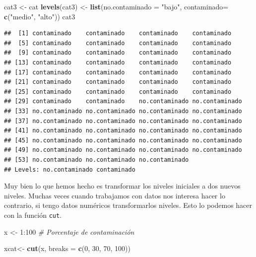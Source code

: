 \documentclass[]{article}
\newenvironment{Shaded}{\begin{snugshade}}{\end{snugshade}}
\newcommand{\KeywordTok}[1]{\textcolor[rgb]{0.13,0.29,0.53}{\textbf{{#1}}}}
\newcommand{\DataTypeTok}[1]{\textcolor[rgb]{0.13,0.29,0.53}{{#1}}}
\newcommand{\DecValTok}[1]{\textcolor[rgb]{0.00,0.00,0.81}{{#1}}}
\newcommand{\StringTok}[1]{\textcolor[rgb]{0.31,0.60,0.02}{{#1}}}
\newcommand{\CommentTok}[1]{\textcolor[rgb]{0.56,0.35,0.01}{\textit{{#1}}}}
\newcommand{\NormalTok}[1]{{#1}}
\begin{document}
\begin{Shaded}
\begin{Highlighting}[]
\NormalTok{cat3 <-}\StringTok{ }\NormalTok{cat}
\KeywordTok{levels}\NormalTok{(cat3) <-}\StringTok{ }\KeywordTok{list}\NormalTok{(}\DataTypeTok{no.contaminado =} \StringTok{"bajo"}\NormalTok{, }\DataTypeTok{contaminado=} \KeywordTok{c}\NormalTok{(}\StringTok{"medio"}\NormalTok{, }\StringTok{"alto"}\NormalTok{))}
\NormalTok{cat3}
\end{Highlighting}
\end{Shaded}

\begin{verbatim}
##  [1] contaminado    contaminado    contaminado    contaminado   
##  [5] contaminado    contaminado    contaminado    contaminado   
##  [9] contaminado    contaminado    contaminado    contaminado   
## [13] contaminado    contaminado    contaminado    contaminado   
## [17] contaminado    contaminado    contaminado    contaminado   
## [21] contaminado    contaminado    contaminado    contaminado   
## [25] contaminado    contaminado    contaminado    contaminado   
## [29] contaminado    contaminado    no.contaminado no.contaminado
## [33] no.contaminado no.contaminado no.contaminado no.contaminado
## [37] no.contaminado no.contaminado no.contaminado no.contaminado
## [41] no.contaminado no.contaminado no.contaminado no.contaminado
## [45] no.contaminado no.contaminado no.contaminado no.contaminado
## [49] no.contaminado no.contaminado no.contaminado no.contaminado
## [53] no.contaminado no.contaminado no.contaminado
## Levels: no.contaminado contaminado
\end{verbatim}

Muy bien lo que hemos hecho es transformar los niveles iniciales a dos
nuevos niveles. Muchas veces cuando trabajamos con datos nos interesa
hacer lo contrario, si tengo datos numéricos transformarlos niveles.
Esto lo podemos hacer con la función \texttt{cut}.

\begin{Shaded}
\begin{Highlighting}[]
\NormalTok{x <-}\StringTok{ }\DecValTok{1}\NormalTok{:}\DecValTok{100} \CommentTok{# Porcentaje de contaminación}

\NormalTok{xcat<-}\StringTok{ }\KeywordTok{cut}\NormalTok{(x, }\DataTypeTok{breaks =} \KeywordTok{c}\NormalTok{(}\DecValTok{0}\NormalTok{, }\DecValTok{30}\NormalTok{, }\DecValTok{70}\NormalTok{, }\DecValTok{100}\NormalTok{))}
\end{Highlighting}
\end{Shaded}
\end{document}
